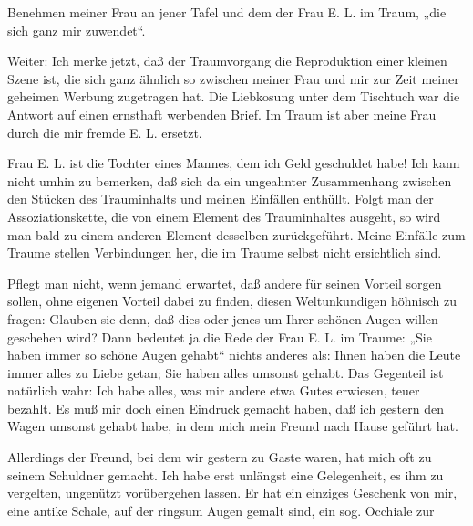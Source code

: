 \documentclass{article}
\begin{document}
        \pstart
        Benehmen meiner Frau an jener Tafel und dem der Frau E. L. im Traum,
                  „die sich ganz mir zuwendet“.
        \pend
    
            
        \pstart
        Weiter: Ich merke jetzt, daß der Traumvorgang die Reproduktion einer
               kleinen Szene ist, die sich ganz ähnlich so zwischen meiner Frau und mir zur
               Zeit meiner geheimen Werbung zugetragen hat. Die Liebkosung unter dem
               Tischtuch war die Antwort auf einen ernsthaft werbenden Brief. Im
               Traum ist aber meine Frau durch die mir fremde E. L. ersetzt.
        \pend
    
            
        \pstart
        Frau E. L. ist die Tochter eines Mannes, dem ich Geld
                  geschuldet habe! Ich kann nicht umhin zu bemerken, daß sich da ein
               ungeahnter Zusammenhang zwischen den Stücken des Trauminhalts und meinen
               Einfällen enthüllt. Folgt man der Assoziationskette, die von einem Element des
               Trauminhaltes ausgeht, so wird man bald zu einem anderen Element
               desselben zurückgeführt. Meine Einfälle zum Traume stellen Verbindungen
               her, die im Traume selbst nicht ersichtlich sind.
        \pend
    
            
        \pstart
        Pflegt man nicht, wenn jemand erwartet, daß andere für seinen Vorteil sorgen
               sollen, ohne eigenen Vorteil dabei zu finden, diesen Weltunkundigen höhnisch zu
               fragen: Glauben sie denn, daß dies oder jenes um
                  Ihrer schönen Augen willen geschehen wird? Dann bedeutet ja die Rede der
               Frau E. L. im Traume: „Sie haben immer so schöne Augen gehabt“ nichts anderes
               als: Ihnen haben die Leute immer alles zu Liebe getan; Sie haben alles umsonst gehabt. Das Gegenteil ist natürlich wahr:
               Ich habe alles, was mir andere etwa Gutes erwiesen, teuer bezahlt. Es muß
               mir doch einen Eindruck gemacht haben, daß ich gestern den Wagen umsonst gehabt habe, in dem mich mein Freund nach
               Hause geführt hat.
        \pend
    
            
        \pstart
        Allerdings der Freund, bei dem wir gestern zu Gaste waren, hat mich oft zu
               seinem Schuldner gemacht. Ich habe erst unlängst eine Gelegenheit, es ihm zu
               vergelten, ungenützt vorübergehen lassen. Er hat ein einziges Geschenk von mir,
               eine antike Schale, auf der ringsum Augen gemalt
               sind, ein sog. Occhiale zur
        \pend
    
\end{document}
